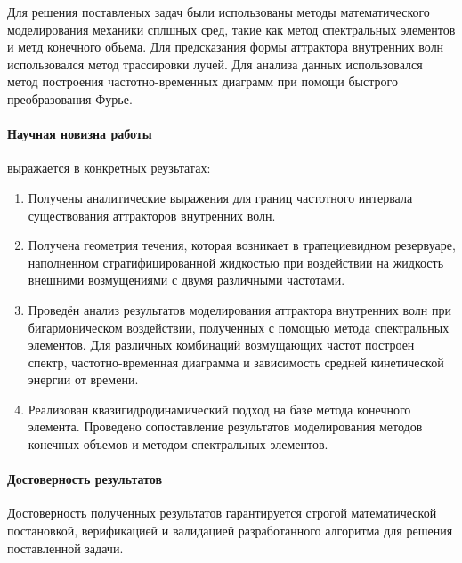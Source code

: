 Для решения поставленых задач были использованы методы математического моделирования механики сплшных сред, такие как метод спектральных элементов и метд конечного объема. Для предсказания формы аттрактора внутренних волн использовался метод трассировки лучей. Для анализа данных использовался метод построения частотно-временных диаграмм при помощи быстрого преобразования Фурье.

\paragraph{Научная новизна работы} выражается в конкретных реузьтатах:
\begin{enumerate}[1.]
  \item Получены аналитические выражения для границ частотного интервала существования аттракторов внутренних волн.%
    
  \item Получена геометрия течения, которая возникает в трапециевидном резервуаре, наполненном стратифицированной жидкостью при воздействии на жидкость внешними возмущениями с двумя различными частотами. 
    
  \item Проведён анализ результатов моделирования аттрактора внутренних волн при бигармоническом воздействии, полученных с помощью метода спектральных элементов. Для различных комбинаций возмущающих частот построен спектр, частотно-временная диаграмма и зависимость средней кинетической энергии от времени. 
    
  \item Реализован квазигидродинамический подход на базе метода конечного элемента. Проведено сопоставление результатов моделирования методов конечных объемов и методом спектральных элементов.
\end{enumerate}

\paragraph{Достоверность результатов}

Достоверность полученных результатов гарантируется строгой математической постановкой, верификацией и валидацией разработанного алгоритма для решения поставленной задачи.


